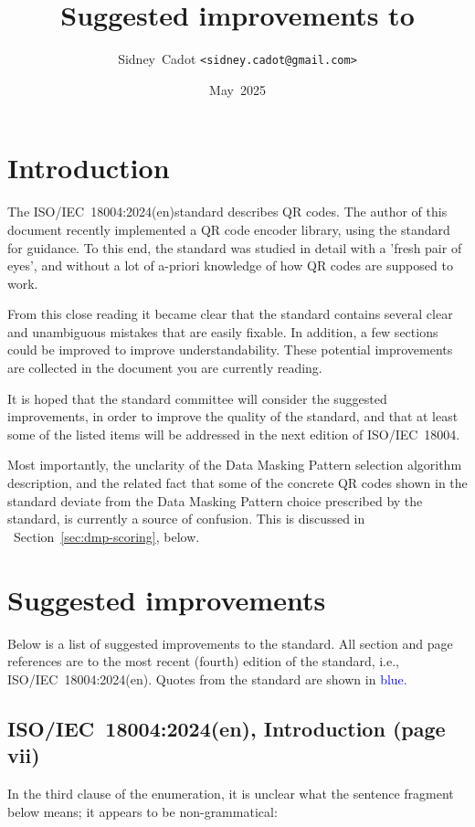 \documentclass[a4paper,twoside]{article}
\title{Suggested improvements to \standard}
\author{Sidney~Cadot \texttt{\textless sidney.cadot@gmail.com\textgreater}}
\date{May~2025}
\newcommand{\shortstandard}{ISO/IEC~18004}
\newcommand{\standard}{\shortstandard:2024(en)}
\begin{document}
%
%
\maketitle
%
%
\section{Introduction}

The \standard standard describes QR codes. The author of this document recently implemented a QR code
encoder library, using the standard for guidance. To this end, the standard was studied in detail with a
'fresh pair of eyes', and without a lot of a-priori knowledge of how QR codes are supposed to work.

From this close reading it became clear that the standard contains several clear and unambiguous mistakes
that are easily fixable. In addition, a few sections could be improved to improve understandability. These
potential improvements are collected in the document you are currently reading.

It is hoped that the standard committee will consider the suggested improvements, in order to improve the quality
of the standard, and that at least some of the listed items will be addressed in the next edition of \shortstandard.

Most importantly, the unclarity of the Data Masking Pattern selection algorithm description, and the related fact
that some of the concrete  QR codes shown in the standard deviate from the Data Masking Pattern choice prescribed by
the standard, is currently a source of confusion. This is discussed in ~Section~\ref{sec:dmp-scoring}, below. 

\section{Suggested improvements}

Below is a list of suggested improvements to the standard. All section and page references are to the most recent (fourth)
edition of the standard, i.e., \standard. Quotes from the standard are shown in \textcolor{blue}{blue}.

\subsection{\standard, Introduction (page vii)}

In the third clause of the enumeration, it is unclear what the sentence fragment below means; it appears to be non-grammatical:
\end{document}
